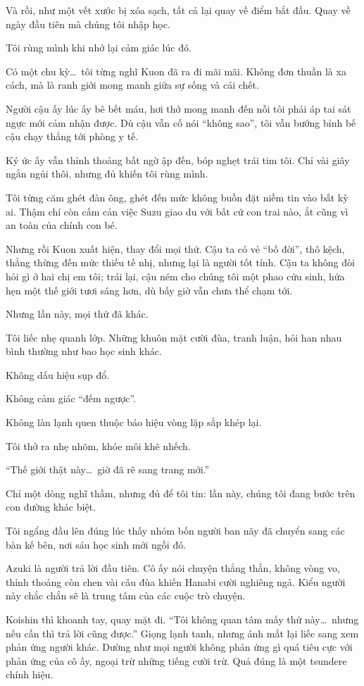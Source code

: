 \documentclass[../main.tex]{subfiles}
\begin{document}
Và rồi, như một vết xước bị xóa sạch, tất cả lại quay về điểm bắt đầu. Quay về ngày đầu tiên mà chúng tôi nhập học.

Tôi rùng mình khi nhớ lại cảm giác lúc đó.

Có một chu kỳ\dots\ tôi từng nghĩ Kuon đã ra đi mãi mãi. Không đơn thuần là xa cách, mà là ranh giới mong manh giữa sự sống và cái chết.

Người cậu ấy lúc ấy bê bết máu, hơi thở mong manh đến nỗi tôi phải áp tai sát ngực mới cảm nhận được. Dù cậu vẫn cố nói ``không sao'', tôi vẫn bướng bỉnh bế cậu chạy thẳng tới phòng y tế.

Ký ức ấy vẫn thỉnh thoảng bất ngờ ập đến, bóp nghẹt trái tim tôi. Chỉ vài giây ngắn ngủi thôi, nhưng đủ khiến tôi rùng mình.

Tôi từng căm ghét đàn ông, ghét đến mức không buồn đặt niềm tin vào bất kỳ ai. Thậm chí còn cấm cản việc Suzu giao du với bất cứ con trai nào, ắt cũng vì an toàn của chính con bé.

Nhưng rồi Kuon xuất hiện, thay đổi mọi thứ. Cậu ta có vẻ ``bố đời'', thô kệch, thẳng thừng đến mức thiếu tế nhị, nhưng lại là người tốt tính. Cậu ta không đòi hỏi gì ở hai chị em tôi; trái lại, cậu ném cho chúng tôi một phao cứu sinh, hứa hẹn một thế giới tươi sáng hơn, dù bấy giờ vẫn chưa thể chạm tới.

Nhưng lần này, mọi thứ đã khác.

Tôi liếc nhẹ quanh lớp. Những khuôn mặt cười đùa, tranh luận, hỏi han nhau bình thường như bao học sinh khác.

Không dấu hiệu sụp đổ.

Không cảm giác ``đếm ngược''.

Không làn lạnh quen thuộc báo hiệu vòng lặp sắp khép lại.

Tôi thở ra nhẹ nhõm, khóe môi khẽ nhếch.

``Thế giới thật này\dots\ giờ đã rẽ sang trang mới.''

Chỉ một dòng nghĩ thầm, nhưng đủ để tôi tin: lần này, chúng tôi đang bước trên con đường khác biệt.

Tôi ngẩng đầu lên đúng lúc thấy nhóm bốn người ban nãy đã chuyển sang các bàn kế bên, nơi sáu học sinh mới ngồi đó.

Azuki là người trả lời đầu tiên.
Cô ấy nói chuyện thẳng thắn, không vòng vo, thỉnh thoảng còn chen vài câu đùa khiến Hanabi cười nghiêng ngả. Kiểu người này chắc chắn sẽ là trung tâm của các cuộc trò chuyện.

Koishin thì khoanh tay, quay mặt đi. ``Tôi không quan tâm mấy thứ này\dots\ nhưng nếu cần thì trả lời cũng được.'' Giọng lạnh tanh, nhưng ánh mắt lại liếc sang xem phản ứng người khác. Dường như mọi người không phản ứng gì quá tiêu cực với phản ứng của cô ấy, ngoại trừ những tiếng cười trừ. Quả đúng là một tsundere chính hiệu.
\end{document}
